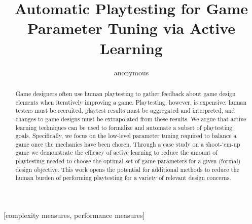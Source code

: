 \documentclass{sig-alternate}
\begin{document}
%

\title{Automatic Playtesting for Game Parameter Tuning via Active Learning}



\author{
\alignauthor
anonymous
}


\maketitle
\begin{abstract}
Game designers often use human playtesting to gather feedback about game design elements when iteratively improving a game.
Playtesting, however, is expensive: human testers must be recruited, playtest results must be aggregated and interpreted, and changes to game designs must be extrapolated from these results.
We argue that active learning techniques can be used to formalize and automate a subset of playtesting goals.
Specifically, we focus on the low-level parameter tuning required to balance a game once the mechanics have been chosen.
Through a case study on a shoot-`em-up game we demonstrate the efficacy of active learning to reduce the amount of playtesting needed to choose the optimal set of game parameters for a given (formal) design objective.
This work opens the potential for additional methods to reduce the human burden of performing playtesting for a variety of relevant design concerns.
\end{abstract}

[complexity measures, performance measures]

\end{document}
